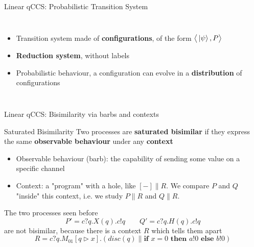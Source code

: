\documentclass{beamer}
\newcommand{\kp}{\ket{\psi}}
\newcommand{\confw}[1]{\big\langle#1\big\rangle}
\newcommand{\blank}{{-}}
\newcommand{\ite}[3]{\textbf{if } #1 \textbf{ then } #2 \textbf{ else } #3}
\begin{document}
\begin{frame}{Linear qCCS: Probabilistic Transition System}
\begin{columns}
\begin{itemize}
\item<1-> Transition system made of \textbf{configurations}, of the form $\confw{\kp, P}$
\item<2-> \textbf{Reduction system}, without labels
\item<3-> Probabilistic behaviour, a configuration can evolve in a \textbf{distribution} of configurations
\end{itemize}

\end{columns}
\end{frame}


\begin{frame}{Linear qCCS: Bisimilarity via barbs and contexts}
\pause
\begin{block}{Saturated Bisimilarity}
Two processes are \textbf{saturated bisimilar} if they express the same \textbf{observable behaviour} under any \textbf{context} 
\pause
\begin{itemize}
\item 
Observable behaviour (barb): the capability of sending some value on a specific channel
\pause
\item Context: a "program" with a hole, like $[\blank] \parallel R$. We compare $P$ and $Q$ "inside" this context, i.e. we study $P \parallel R$ and $Q \parallel R$.
\end{itemize}
\end{block}


\pause
The two processes seen before \[
 P' = c?q.X(q).c!q \qquad Q' = c?q.H(q).c!q
\]
are not bisimilar, because there is a context $R$ which tells them apart
\[ R = c?q.M_{01}[q \rhd x].\left( disc(q)\parallel \ite{x = 0}{a!0}{b!0}\right)\]

\end{frame}
\end{document}
